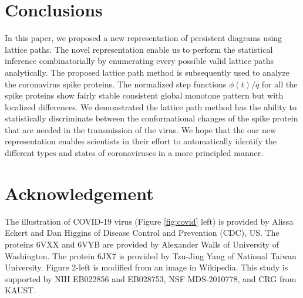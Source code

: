 \documentclass{llncs}
\begin{document}
\section{Conclusions}\vspace{-5pt}
In this paper, we proposed a new representation of persistent diagrams using lattice paths. The novel representation enable us to perform the statistical inference combinatorially by enumerating every possible valid lattice paths analytically. The  proposed lattice path method is subsequently used to analyze the coronavirus spike proteins. The normalized step functions $\phi(t)/q$ for all the spike proteins show fairly stable consistent global monotone pattern but with localized differences. We demonstrated the  lattice path method has the ability to statistically discriminate between the conformational changes of the spike protein that are needed in the transmission of the virus. We hope that the our new representation enables scientists in their effort to automatically identify the different types and states of coronaviruses in a more principled manner. 

\section*{Acknowledgement}
The illustration of COVID-19 virus (Figure \ref{fig:covid} left) is provided by Alissa Eckert and Dan Higgins of Disease Control and Prevention (CDC), US. The proteins 6VXX and 6VYB are provided by Alexander Walls of University of Washington. The protein 6JX7 is provided by Tzu-Jing Yang of National Taiwan University. Figure 2-left is modified from an image in Wikipedia. This study is supported by NIH EB022856 and EB028753, NSF MDS-2010778, and CRG from KAUST. 



\end{document}
